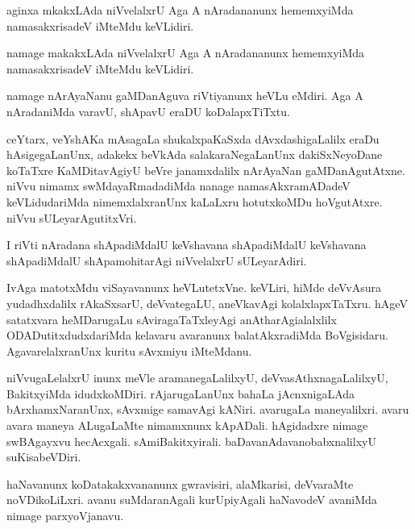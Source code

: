 \documentclass{article}
\begin{document}
\begin{mn}
aginxa  mkakxLAda  niVvelalxrU  Aga  A  nAradananunx  hememxyiMda  namasakxrisadeV  iMteMdu  keVLidiri.
\end{mn}

\begin{mn}
namage  makakxLAda  niVvelalxrU  Aga  A  nAradananunx  hememxyiMda  namasakxrisadeV  iMteMdu  keVLidiri.
\end{mn}

\begin{mn}
namage  nArAyaNanu  gaMDanAguva  riVtiyanunx  heVLu  eMdiri.  Aga  A  nAradaniMda  varavU,  
shApavU  eraDU  koDalapxTiTxtu.
\end{mn}

\begin{mn}
ceYtarx,  veYshAKa  mAsagaLa  shukalxpaKaSxda  dAvxdashigaLalilx  eraDu  hAsigegaLanUnx,  
adakekx  beVkAda  salakaraNegaLanUnx  dakiSxNeyoDane  koTaTxre  KaMDitavAgiyU  beVre  janamxdalilx  
nArAyaNan  gaMDanAgutAtxne.  niVvu  nimamx  swMdayaRmadadiMda  nanage  namasAkxramADadeV  
keVLidudariMda  nimemxlalxranUnx  kaLaLxru  hotutxkoMDu  hoVgutAtxre.  niVvu  sULeyarAgutitxVri.    
\end{mn}

\begin{mn}
I riVti  nAradana  shApadiMdalU  keVshavana  shApadiMdalU  keVshavana  shApadiMdalU  shApamohitarAgi  
niVvelalxrU  sULeyarAdiri.
\end{mn}

\begin{mn}
IvAga  matotxMdu  viSayavanunx  heVLutetxVne.  keVLiri,  hiMde  deVvAsura  yudadhxdalilx  rAkaSxsarU,  
deVvategaLU,  aneVkavAgi  kolalxlapxTaTxru.  hAgeV  satatxvara  heMDarugaLu  sAviragaTaTxleyAgi  
anAtharAgialalxlilx  ODADutitxdudxdariMda  kelavaru  avaranunx  balatAkxradiMda  BoVgisidaru.  
AgavarelalxranUnx  kuritu  sAvxmiyu  iMteMdanu.
\end{mn}

\begin{mn}
niVvugaLelalxrU  inunx  meVle  aramanegaLalilxyU,  deVvasAthxnagaLalilxyU,  BakitxyiMda  idudxkoMDiri.  
rAjarugaLanUnx  bahaLa  jAcnxnigaLAda  bArxhamxNaranUnx,  sAvxmige  samavAgi  kANiri.  avarugaLa  
maneyalilxri.  avaru  avara  maneya  ALugaLaMte  nimamxnunx  kApADali.  hAgidadxre  nimage  swBAgayxvu  
hecAcxgali.  sAmiBakitxyirali.  baDavanAdavanobabxnalilxyU  suKisabeVDiri.
\end{mn}

\begin{mn}
haNavanunx  koDatakakxvananunx  gwravisiri,  alaMkarisi,  deVvaraMte  noVDikoLiLxri.  
avanu  suMdaranAgali  kurUpiyAgali  haNavodeV  avaniMda  nimage  parxyoVjanavu.
\end{mn}
\end{document}
